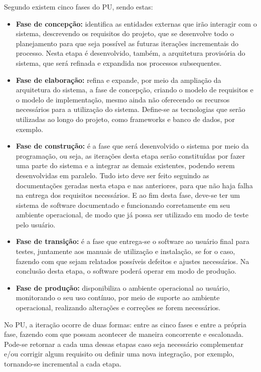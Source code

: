 Segundo  existem cinco fases do PU, sendo estas:
\begin{itemize}
    \item \textbf{Fase de concepção: }identifica as entidades externas que irão interagir com o sistema, descrevendo os requisitos do projeto, que se desenvolve todo o planejamento para que seja possível as futuras iterações incrementais do processo. Nesta etapa é desenvolvido, também, a arquitetura provisória do sistema, que será refinada e expandida nos processos subsequentes.
    \item \textbf{Fase de elaboração: }refina e expande, por meio da ampliação da arquitetura do sistema, a fase de concepção, criando o modelo de requisitos e o modelo de implementação, mesmo ainda não oferecendo os recursos necessários para a utilização do sistema. Define-se as tecnologias que serão utilizadas ao longo do projeto, como frameworks e banco de dados, por exemplo.
    \item \textbf{Fase de construção: }é a fase que será desenvolvido o sistema por meio da programação, ou seja, as iterações desta etapa serão constituídas por fazer uma parte do sistema e a integrar as demais existentes, podendo serem desenvolvidas em paralelo. Tudo isto deve ser feito seguindo as documentações geradas nesta etapa e nas anteriores, para que não haja falha na entrega dos requisitos necessários. E ao fim desta fase, deve-se ter um sistema de software documentado e funcionando corretamente em seu ambiente operacional, de modo que já possa ser utilizado em modo de teste pelo usuário.
    \item \textbf{Fase de transição: }é a fase que entrega-se o software ao usuário final para testes, juntamente aos manuais de utilização e instalação, se for o caso, fazendo com que sejam relatados possíveis defeitos e ajustes necessários. Na conclusão desta etapa, o software poderá operar em modo de produção.
    \item \textbf{Fase de produção: }disponibiliza o ambiente operacional ao usuário, monitorando o seu uso contínuo, por meio de suporte ao ambiente operacional, realizando alterações e correções se forem necessários.
\end{itemize}

No PU, a iteração ocorre de duas formas: entre as cinco fases e entre a própria fase, fazendo com que possam acontecer de maneira concorrente e escalonada. Pode-se retornar a cada uma dessas etapas caso seja necessário complementar e/ou corrigir algum requisito ou definir uma nova integração, por exemplo, tornando-se incremental a cada etapa.


